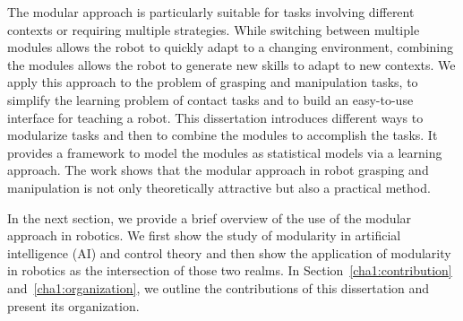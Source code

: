 The modular approach is particularly suitable for tasks involving different contexts or requiring multiple strategies. While switching between multiple modules allows the robot to quickly adapt to a changing environment, combining the modules allows the robot to generate new skills to adapt to new contexts. We apply this approach to the problem of grasping and manipulation tasks, to simplify the learning problem of contact tasks and to build an easy-to-use interface for teaching a robot. This dissertation introduces different ways to modularize tasks and then to combine the modules to accomplish the tasks. It provides a framework to model the modules as statistical models via a learning approach. The work shows that the modular approach in robot grasping and manipulation is not only theoretically attractive but also a practical method.

In the next section, we provide a brief overview of the use of the modular approach in robotics. We first show the study of modularity in artificial intelligence (AI) and control theory and then show the application of modularity in robotics as the intersection of those two realms. In Section~\ref{cha1:contribution} and~\ref{cha1:organization}, we outline the contributions of this dissertation and present its organization.






